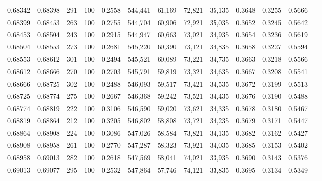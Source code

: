 \begin{tabular}{rrrrrrrrrrrrr}
0.68342 & 0.68398 &   291 & 100 &                                     0.2558 & 544,441 &  61,169 &  72,821 &  35,135 & 0.3648 & 0.3255 & 0.5666 \\
0.68399 & 0.68453 &   263 & 100 &                                     0.2755 & 544,704 &  60,906 &  72,921 &  35,035 & 0.3652 & 0.3245 & 0.5642 \\
0.68453 & 0.68504 &   243 & 100 &                                     0.2915 & 544,947 &  60,663 &  73,021 &  34,935 & 0.3654 & 0.3236 & 0.5619 \\
0.68504 & 0.68553 &   273 & 100 &                                     0.2681 & 545,220 &  60,390 &  73,121 &  34,835 & 0.3658 & 0.3227 & 0.5594 \\
0.68553 & 0.68612 &   301 & 100 &                                     0.2494 & 545,521 &  60,089 &  73,221 &  34,735 & 0.3663 & 0.3218 & 0.5566 \\
0.68612 & 0.68666 &   270 & 100 &                                     0.2703 & 545,791 &  59,819 &  73,321 &  34,635 & 0.3667 & 0.3208 & 0.5541 \\
0.68666 & 0.68725 &   302 & 100 &                                     0.2488 & 546,093 &  59,517 &  73,421 &  34,535 & 0.3672 & 0.3199 & 0.5513 \\
0.68725 & 0.68774 &   275 & 100 &                                     0.2667 & 546,368 &  59,242 &  73,521 &  34,435 & 0.3676 & 0.3190 & 0.5488 \\
0.68774 & 0.68819 &   222 & 100 &                                     0.3106 & 546,590 &  59,020 &  73,621 &  34,335 & 0.3678 & 0.3180 & 0.5467 \\
0.68819 & 0.68864 &   212 & 100 &                                     0.3205 & 546,802 &  58,808 &  73,721 &  34,235 & 0.3679 & 0.3171 & 0.5447 \\
0.68864 & 0.68908 &   224 & 100 &                                     0.3086 & 547,026 &  58,584 &  73,821 &  34,135 & 0.3682 & 0.3162 & 0.5427 \\
0.68908 & 0.68958 &   261 & 100 &                                     0.2770 & 547,287 &  58,323 &  73,921 &  34,035 & 0.3685 & 0.3153 & 0.5402 \\
0.68958 & 0.69013 &   282 & 100 &                                     0.2618 & 547,569 &  58,041 &  74,021 &  33,935 & 0.3690 & 0.3143 & 0.5376 \\
0.69013 & 0.69077 &   295 & 100 &                                     0.2532 & 547,864 &  57,746 &  74,121 &  33,835 & 0.3695 & 0.3134 & 0.5349 \\

\end{tabular}
